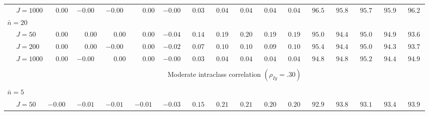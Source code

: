 \begin{sidewaystable}
\begin{threeparttable}
\begin{tabular}{llccccccccccccccc}
 & \nopagebreak $\;J=1000$  & $\phantom{-}0.00\phantom{0}$ & ${-}0.00\phantom{0}$ & ${-}0.00\phantom{0}$ & $\phantom{-}0.00\phantom{0}$ & ${-}0.00\phantom{0}$ & $\phantom{0}0.03\phantom{0}$ & $\phantom{0}0.04\phantom{0}$ & $\phantom{0}0.04\phantom{0}$ & $\phantom{0}0.04\phantom{0}$ & $\phantom{0}0.04\phantom{0}$ & $\phantom{0}96.5\phantom{0}$ & $\phantom{0}95.8\phantom{0}$ & $\phantom{0}95.7\phantom{0}$ & $\phantom{0}95.9\phantom{0}$ & $\phantom{0}96.2\phantom{0}$ \\
\multicolumn{4}{l}{$\bar{n}=20$} \\  & \nopagebreak $\;J=50$  & $\phantom{-}0.00\phantom{0}$ & $\phantom{-}0.00\phantom{0}$ & $\phantom{-}0.00\phantom{0}$ & $\phantom{-}0.00\phantom{0}$ & ${-}0.04\phantom{0}$ & $\phantom{0}0.14\phantom{0}$ & $\phantom{0}0.19\phantom{0}$ & $\phantom{0}0.20\phantom{0}$ & $\phantom{0}0.19\phantom{0}$ & $\phantom{0}0.19\phantom{0}$ & $\phantom{0}95.0\phantom{0}$ & $\phantom{0}94.4\phantom{0}$ & $\phantom{0}95.0\phantom{0}$ & $\phantom{0}94.9\phantom{0}$ & $\phantom{0}93.6\phantom{0}$ \\
 & \nopagebreak $\;J=200$  & $\phantom{-}0.00\phantom{0}$ & $\phantom{-}0.00\phantom{0}$ & ${-}0.00\phantom{0}$ & $\phantom{-}0.00\phantom{0}$ & ${-}0.02\phantom{0}$ & $\phantom{0}0.07\phantom{0}$ & $\phantom{0}0.10\phantom{0}$ & $\phantom{0}0.10\phantom{0}$ & $\phantom{0}0.09\phantom{0}$ & $\phantom{0}0.10\phantom{0}$ & $\phantom{0}95.4\phantom{0}$ & $\phantom{0}94.4\phantom{0}$ & $\phantom{0}95.0\phantom{0}$ & $\phantom{0}94.3\phantom{0}$ & $\phantom{0}93.7\phantom{0}$ \\
 & \nopagebreak $\;J=1000$  & $\phantom{-}0.00\phantom{0}$ & ${-}0.00\phantom{0}$ & $\phantom{-}0.00\phantom{0}$ & $\phantom{-}0.00\phantom{0}$ & ${-}0.00\phantom{0}$ & $\phantom{0}0.03\phantom{0}$ & $\phantom{0}0.04\phantom{0}$ & $\phantom{0}0.04\phantom{0}$ & $\phantom{0}0.04\phantom{0}$ & $\phantom{0}0.04\phantom{0}$ & $\phantom{0}94.8\phantom{0}$ & $\phantom{0}94.8\phantom{0}$ & $\phantom{0}95.2\phantom{0}$ & $\phantom{0}94.4\phantom{0}$ & $\phantom{0}94.9\phantom{0}$ \\
[0.5ex]\hline\\[-1.6ex] 
& & \multicolumn{15}{c}{Moderate intraclass correlation $(\rho_{Iy}=.30)$} \\[0.6ex]\hline\\[-1.8ex]
\multicolumn{4}{l}{$\bar{n}=5$} \\  & \nopagebreak $\;J=50$  & ${-}0.00\phantom{0}$ & ${-}0.01\phantom{0}$ & ${-}0.01\phantom{0}$ & ${-}0.01\phantom{0}$ & ${-}0.03\phantom{0}$ & $\phantom{0}0.15\phantom{0}$ & $\phantom{0}0.21\phantom{0}$ & $\phantom{0}0.21\phantom{0}$ & $\phantom{0}0.20\phantom{0}$ & $\phantom{0}0.20\phantom{0}$ & $\phantom{0}92.9\phantom{0}$ & $\phantom{0}93.8\phantom{0}$ & $\phantom{0}93.1\phantom{0}$ & $\phantom{0}93.4\phantom{0}$ & $\phantom{0}93.9\phantom{0}$ \\

\end{tabular}
\end{threeparttable}
\end{sidewaystable}
